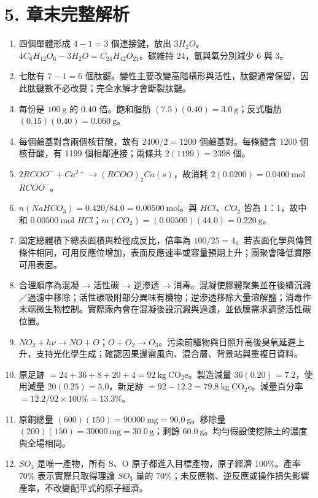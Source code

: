 \documentclass[11pt,a4paper]{article}
\providecommand{\tightlist}{%
  \setlength{\itemsep}{0pt}\setlength{\parskip}{0pt}}
\begin{document}
\section{5. 章末完整解析}\label{ux7ae0ux672bux5b8cux6574ux89e3ux6790}

\begin{enumerate}
\def\labelenumi{\arabic{enumi}.}
\tightlist
\item
  四個單體形成 \(4-1=3\) 個連接鍵，放出 \(3H_2O\)。\(4C_6H_{12}O_6-3H_2O=C_{24}H_{42}O_{21}\)。碳維持 24，氫與氧分別減少 6 與 3。
\item
  七肽有 \(7-1=6\) 個肽鍵。變性主要改變高階構形與活性，肽鍵通常保留，因此肽鍵數不必改變；完全水解才會斷裂肽鍵。
\item
  每份是 \(100\ \mathrm g\) 的 0.40 倍。飽和脂肪 \((7.5)(0.40)=3.0\ \mathrm g\)；反式脂肪 \((0.15)(0.40)=0.060\ \mathrm g\)。
\item
  每個鹼基對含兩個核苷酸，故有 \(2400/2=1200\) 個鹼基對。每條鏈含 1200 個核苷酸，有 1199 個相鄰連接；兩條共 \(2(1199)=2398\) 個。
\item
  \(2RCOO^-+Ca^{2+}\rightarrow(RCOO)_2Ca(s)\)，故消耗 \(2(0.0200)=0.0400\ \mathrm{mol}\) \(RCOO^-\)。
\item
  \(n(NaHCO_3)=0.420/84.0=0.00500\ \mathrm{mol}\)。與 \(HCl\)、\(CO_2\) 皆為 1：1，故中和 \(0.00500\ \mathrm{mol}\) \(HCl\)；\(m(CO_2)=(0.00500)(44.0)=0.220\ \mathrm g\)。
\item
  固定總體積下總表面積與粒徑成反比，倍率為 \(100/25=4\)。若表面化學與傳質條件相同，可用反應位增加，表面反應速率或容量預期上升；團聚會降低實際可用表面。
\item
  合理順序為混凝 → 活性碳 → 逆滲透 → 消毒。混凝使膠體聚集並在後續沉澱／過濾中移除；活性碳吸附部分異味有機物；逆滲透移除大量溶解鹽；消毒作末端微生物控制。實際廠內會在混凝後設沉澱與過濾，並依膜需求調整活性碳位置。
\item
  \(NO_2+h\nu\rightarrow NO+O\)；\(O+O_2\rightarrow O_3\)。污染前驅物與日照升高後臭氧延遲上升，支持光化學生成；確認因果還需風向、混合層、背景站與重複日資料。
\item
  原足跡 \(=24+36+8+20+4=92\ \mathrm{kg\ CO_2e}\)。製造減量 \(36(0.20)=7.2\)，使用減量 \(20(0.25)=5.0\)，新足跡 \(=92-12.2=79.8\ \mathrm{kg\ CO_2e}\)。減量百分率 \(=12.2/92\times100\%=13.3\%\)。
\item
  原銅總量 \((600)(150)=90000\ \mathrm{mg}=90.0\ \mathrm g\)。移除量 \((200)(150)=30000\ \mathrm{mg}=30.0\ \mathrm g\)；剩餘 \(60.0\ \mathrm g\)。均勻假設使挖除土的濃度與全場相同。
\item
  \(SO_3\) 是唯一產物，所有 S、O 原子都進入目標產物，原子經濟 100\%。產率 70\% 表示實際只取得理論 \(SO_3\) 量的 70\%；未反應物、逆反應或操作損失影響產率，不改變配平式的原子經濟。

\end{enumerate}
\end{document}
